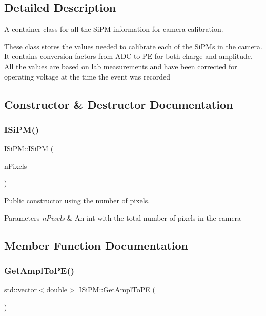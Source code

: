 \subsection{Detailed Description}
A container class for all the Si\+PM information for camera calibration. 

These class stores the values needed to calibrate each of the Si\+P\+Ms in the camera. It contains conversion factors from A\+DC to PE for both charge and amplitude. All the values are based on lab measurements and have been corrected for operating voltage at the time the event was recorded 

\subsection{Constructor \& Destructor Documentation}
\mbox{\label{classISiPM_afa4d53f967af2c55bc355733fd803e97}} 
\subsubsection{\texorpdfstring{I\+Si\+P\+M()}{ISiPM()}}
{\footnotesize\ttfamily I\+Si\+P\+M\+::\+I\+Si\+PM (\begin{DoxyParamCaption}\item[{int}]{n\+Pixels }\end{DoxyParamCaption})}



Public constructor using the number of pixels. 


\begin{DoxyParams}{Parameters}
{\em n\+Pixels} & An int with the total number of pixels in the camera \\
\hline
\end{DoxyParams}


\subsection{Member Function Documentation}
\mbox{\label{classISiPM_af4f61eeb6e0be8e5c291b3a2407746e8}} 
\subsubsection{\texorpdfstring{Get\+Ampl\+To\+P\+E()}{GetAmplToPE()}}
{\footnotesize\ttfamily std\+::vector$<$double$>$ I\+Si\+P\+M\+::\+Get\+Ampl\+To\+PE (\begin{DoxyParamCaption}{ }\end{DoxyParamCaption})}




